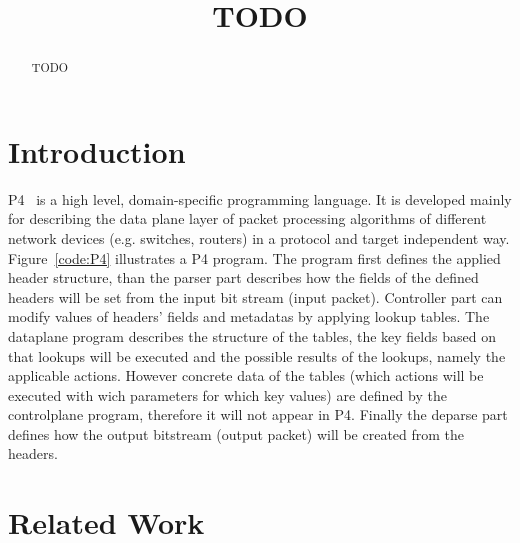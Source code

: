 \documentclass[sigconf]{acmart}
\begin{document}
	
	
	\title{TODO}
	
	
	\author{}
	\email{}
	\orcid{}
	\author{}
	\authornotemark[]
	\email{}
	\affiliation{%
		\institution{}
		\streetaddress{}
		\city{}
		\state{}
		\country{}
		\postcode{}
	}
	
	
	\begin{abstract}
		TODO
	\end{abstract}
	

	
	
	
	\maketitle
	
	\section{Introduction}
	P4~\cite{p4paper} is a high level, domain-specific programming language. It is developed mainly for
describing the data plane layer of packet processing algorithms of different network
devices (e.g. switches, routers) in a protocol and target independent way. Figure~\ref{code:P4} illustrates a P4 program. The program first defines the applied header structure, than the parser part describes how the fields of the defined headers will be set from the input bit stream (input packet). Controller part can modify values of headers' fields and metadatas by applying lookup tables. The dataplane program describes the structure of the tables, the key fields based on that lookups will be executed and the possible results of the lookups, namely the applicable actions. However concrete data of the tables (which actions will be executed with wich parameters for which key values) are defined by the controlplane program, therefore it will not appear in P4. Finally the deparse part defines how the output bitstream (output packet) will be created from the headers.   
	
	
	\section{Related Work}
	
\end{document}
